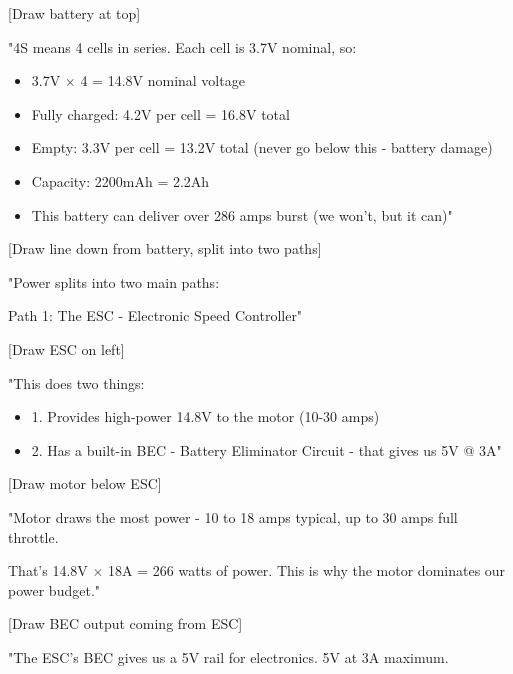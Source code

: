 \documentclass[11pt,letterpaper]{article}
\begin{document}
{[Draw battery at top]\par

"4S means 4 cells in series. Each cell is 3.7V nominal, so:\par

\begin{itemize}
  \item 3.7V $\times$ 4 = 14.8V nominal voltage
  \item Fully charged: 4.2V per cell = 16.8V total
  \item Empty: 3.3V per cell = 13.2V total (never go below this - battery damage)
  \item Capacity: 2200mAh = 2.2Ah
  \item This battery can deliver over 286 amps burst (we won't, but it can)"
\end{itemize}

[Draw line down from battery, split into two paths]\par

"Power splits into two main paths:\par

Path 1: The ESC - Electronic Speed Controller"\par

[Draw ESC on left]\par

"This does two things:\par

\begin{itemize}
  \item 1. Provides high-power 14.8V to the motor (10-30 amps)
  \item 2. Has a built-in BEC - Battery Eliminator Circuit - that gives us 5V @ 3A"
\end{itemize}

[Draw motor below ESC]\par

"Motor draws the most power - 10 to 18 amps typical, up to 30 amps full throttle.\par

That's 14.8V $\times$ 18A = 266 watts of power. This is why the motor dominates our power budget."\par

[Draw BEC output coming from ESC]\par

"The ESC's BEC gives us a 5V rail for electronics. 5V at 3A maximum.\par

}
\end{document}
